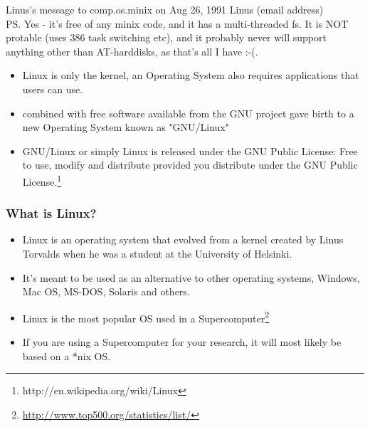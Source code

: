 \documentclass[10pt,t]{beamer}
\begin{document}
{\begin{exampleblock}{Linus's message to comp.os.minix on Aug 26, 1991}
{Linus (email address)\\
PS.  Yes - it's free of any minix code, and it has a multi-threaded fs. It is NOT protable (uses 386 task switching etc), and it probably never will support anything other than AT-harddisks, as that's all I have :-(.\\
}
            {\fontsize{5}{7}}
      \end{exampleblock}
	  \begin{itemize}
    \item Linux is only the kernel, an Operating System also requires applications that users can use.
    \item combined with free software available from the GNU project gave birth to a new Operating System known as "GNU/Linux"
    \item GNU/Linux or simply Linux is released under the GNU Public License: Free to use, modify and distribute provided you distribute under the GNU Public License.\let\thefootnote\relax\footnote{\tiny http://en.wikipedia.org/wiki/Linux}
  \end{itemize}
  }

\begin{frame}
  \frametitle{What is Linux?}
  \begin{itemize}
    \item Linux is an operating system that evolved from a kernel created by Linus Torvalds when he was a student at the University of Helsinki. 
    \item It's meant to be used as an alternative to other operating systems, Windows, Mac OS, MS-DOS, Solaris and others. 
    \item Linux is the most popular OS used in a Supercomputer\let\thefootnote\relax\footnote{\tiny \url{http://www.top500.org/statistics/list/}}
      
    \item If you are using a Supercomputer for your research, it will most likely be based on a *nix OS.
  \end{itemize}
\end{frame}
\end{document}
